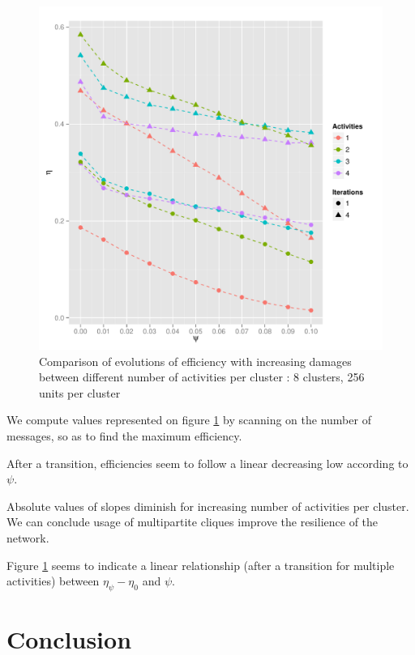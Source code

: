 \documentclass[english,10pt,twocolumn]{IEEEtran}
\theoremstyle{definition}
\begin{document}
	\begin{figure}[!htb]
		
		\includegraphics[scale=0.50]{Courbes/5portant_psi_c8l256e4}
		\caption{Comparison of evolutions of efficiency with increasing damages between different number of activities per cluster :  8 clusters, 256 units per cluster%
		\label{comppsi}}
	\end{figure}

	We compute values represented on figure \ref{comppsi} by scanning on the number of messages, so as to find the maximum efficiency.	
	
	After a transition, efficiencies seem to follow a linear decreasing low according to $\psi$.
	
	Absolute values of slopes diminish for increasing number of activities per cluster. We can conclude usage of multipartite cliques improve the resilience of the network.
	
	
	
	
	Figure \ref{comppsi} seems to indicate a linear relationship (after a transition for multiple activities) between $\eta_\psi -\eta_0$ and $\psi$.
	
	
	\section{Conclusion}	
	
\end{document}
